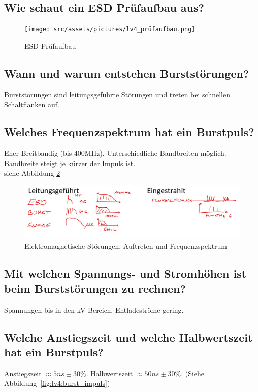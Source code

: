 \subsection{Wie schaut ein ESD Prüfaufbau aus?}
\begin{figure}[!ht]
  \centering
  \texttt{[image: src/assets/pictures/lv4\_prüfaufbau.png]}
  \caption{ESD Prüfaufbau}\label{fig:lv4:esd_test}
\end{figure}

\subsection{Wann und warum entstehen Burststörungen?}
Burststörungen sind leitungsgeführte Störungen und treten bei schnellen Schaltflanken auf.

\subsection{Welches Frequenzspektrum hat ein Burstpuls?}
Eher Breitbandig (bis 400MHz). Unterschiedliche Bandbreiten möglich. Bandbreite steigt je kürzer der Impuls ist.\\
siehe Abbildung \ref{fig:lv4:electro_interferences}
\begin{figure}[ht]
  \centering
  \includegraphics[width=17cm]{src/assets/pictures/lv4_elektromagnetische_stoerungen.jpg}
  \caption{Elektromagnetische Störungen, Auftreten und Frequenzspektrum}\label{fig:lv4:electro_interferences}
\end{figure}

\subsection{Mit welchen Spannungs- und Stromhöhen ist beim Burststörungen zu rechnen?}
Spannungen bis in den kV-Bereich. Entladeströme gering.

\subsection{Welche Anstiegszeit und welche Halbwertszeit hat ein Burstpuls?}
Anstiegszeit \(\approx 5ns \pm 30\%\). Halbwertszeit \(\approx 50ns \pm 30\%\). (Siehe Abbildung~\ref{fig:lv4:burst_impuls})

